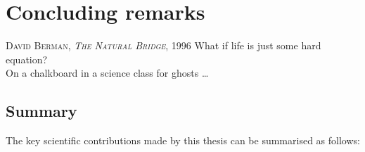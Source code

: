 
\chapter{Concluding remarks} 
\label{chapter:conclusion} 

\ifpdf
    \graphicspath{{Conclusion/Figs/Raster/}{Conclusion/Figs/PDF/}{Conclusion/Figs/}}
\else
    \graphicspath{{Conclusion/Figs/Vector/}{Conclusion/Figs/}}
\fi


\begin{pquotation}{\textsc{David Berman, \textit{The Natural Bridge}, 1996}}
What if life is just some hard equation? \\
On a chalkboard in a science class for ghosts \ldots
\end{pquotation}


\section{Summary}

The key scientific contributions made by this thesis can be summarised as follows:

